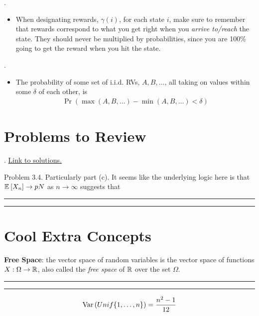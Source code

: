 \documentclass[12pt]{article}
\newcommand{\myspace}{\vspace{2\bigskipamount}}
\newcommand\p{\Needspace{12\baselineskip} \noindent}
\begin{document}
\myspace
\p {}. 
\begin{itemize}
	\item When designating rewards, $\gamma(i)$, for each state $i$, make sure to remember that rewards correspond to what you get right when you \textit{arrive to/reach} the state. They should never be multiplied by probabilities, since you are 100\% going to get the reward when you hit the state.
\end{itemize}

\myspace
\p {}. 
\begin{itemize}
	\item The probability of some set of i.i.d. RVs, $A, B, \ldots$, all taking on values within some $\delta$ of each other, is
	\begin{align}
		\Pr(\max(A, B, \ldots) - \min(A, B, \ldots) < \delta) 
	\end{align}
\end{itemize}


\clearpage
\section*{\Large{Problems to Review}}

\p {}. \href{https://d1b10bmlvqabco.cloudfront.net/attach/irwxcmgdofp2uz/hzcyh0n929z1id/iwgoqrni6gl7/cs70_sp16_f_sol.pdf}{Link to solutions.}
\begin{compactitem}
	\item Problem 3.4. Particularly part (c). It seems like the underlying logic here is that $\mathbb{E}_{}\left[X_n\right] \rightarrow pN$ as $n \rightarrow \infty$ suggests that 
\end{compactitem}

\myspace
\hrule\hrule
\section*{\Large Cool Extra Concepts}

\begin{compactitem}
	\item \textbf{Free Space}: the vector space of random variables is the vector space of functions $X:\Omega\rightarrow\mathbb{R}$, also called the \textit{free space} of $\mathbb{R}$ over the set $\Omega$.
\end{compactitem}
\myspace
\hrule\hrule




\begin{align}
\text{Var}\left(Unif\{1, \ldots, n\} \right) = \frac{n^2 - 1}{12}
\end{align}
\end{document}

